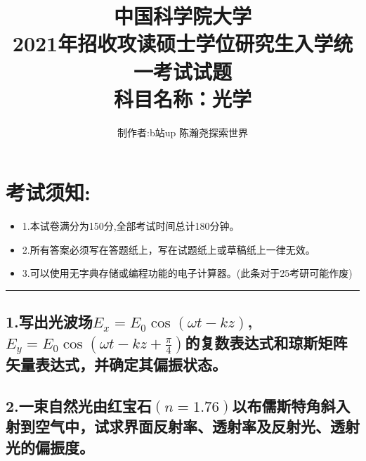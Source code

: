 \documentclass[11pt,a4paper]{article}
\begin{document}
    \title{中国科学院大学\\2021年招收攻读硕士学位研究生入学统一考试试题\\科目名称：光学}
    \author{制作者:b站up 陈瀚尧探索世界}
    \date{}
    \maketitle
    \titleformat{\section}[block]{\normalfont\Large\bfseries}{}{0pt}{}


    \section{考试须知:}
    \begin{itemize}[topsep=0pt,itemsep=0pt,partopsep=0pt]
        \item 1.本试卷满分为150分,全部考试时间总计180分钟。
        \vspace{-3mm}
        \item 2.所有答案必须写在答题纸上，写在试题纸上或草稿纸上一律无效。
        \vspace{-3mm}
        \item 3.可以使用无字典存储或编程功能的电子计算器。(此条对于25考研可能作废)
    \end{itemize}
    \vspace{-5mm}
    \noindent\rule{\textwidth}{0.5pt} %
    \vspace{-12mm}
    \subsection*{1.写出光波场$E_x=E_0\cos (\omega t-kz)$,$E_y=E_0\cos (\omega t-kz+\frac{\pi}{4})$的复数表达式和琼斯矩阵矢量表达式，并确定其偏振状态。}
    \vspace{15mm}
    \subsection*{2.一束自然光由红宝石$(n=1.76)$以布儒斯特角斜入射到空气中，试求界面反射率、透射率及反射光、透射光的偏振度。}
    \vspace{15mm}
\end{document}
